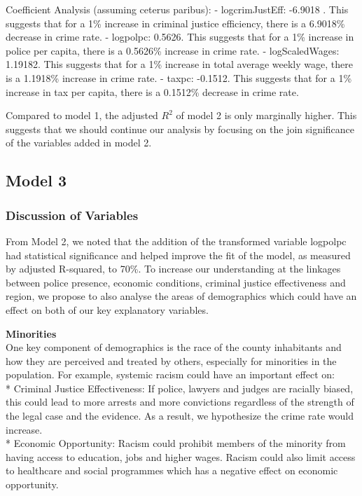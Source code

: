 \documentclass[]{article}
\begin{document}
Coefficient Analysis (assuming ceterus paribus): - logcrimJustEff:
-6.9018 . This suggests that for a 1\% increase in criminal justice
efficiency, there is a 6.9018\% decrease in crime rate. - logpolpc:
0.5626. This suggests that for a 1\% increase in police per capita,
there is a 0.5626\% increase in crime rate. - logScaledWages: 1.19182.
This suggests that for a 1\% increase in total average weekly wage,
there is a 1.1918\% increase in crime rate. - taxpc: -0.1512. This
suggests that for a 1\% increase in tax per capita, there is a 0.1512\%
decrease in crime rate.

Compared to model 1, the adjusted \(R^2\) of model 2 is only marginally
higher. This suggests that we should continue our analysis by focusing
on the join significance of the variables added in model 2.

\hypertarget{model-3}{%
\subsection{Model 3}\label{model-3}}

\hypertarget{discussion-of-variables}{%
\subsubsection{Discussion of Variables}\label{discussion-of-variables}}

From Model 2, we noted that the addition of the transformed variable
logpolpc had statistical significance and helped improve the fit of the
model, as measured by adjusted R-squared, to 70\%. To increase our
understanding at the linkages between police presence, economic
conditions, criminal justice effectiveness and region, we propose to
also analyse the areas of demographics which could have an effect on
both of our key explanatory variables.

\textbf{Minorities}\\
One key component of demographics is the race of the county inhabitants
and how they are perceived and treated by others, especially for
minorities in the population. For example, systemic racism could have an
important effect on:\\
* Criminal Justice Effectiveness: If police, lawyers and judges are
racially biased, this could lead to more arrests and more convictions
regardless of the strength of the legal case and the evidence. As a
result, we hypothesize the crime rate would increase.\\
* Economic Opportunity: Racism could prohibit members of the minority
from having access to education, jobs and higher wages. Racism could
also limit access to healthcare and social programmes which has a
negative effect on economic opportunity.
\end{document}
